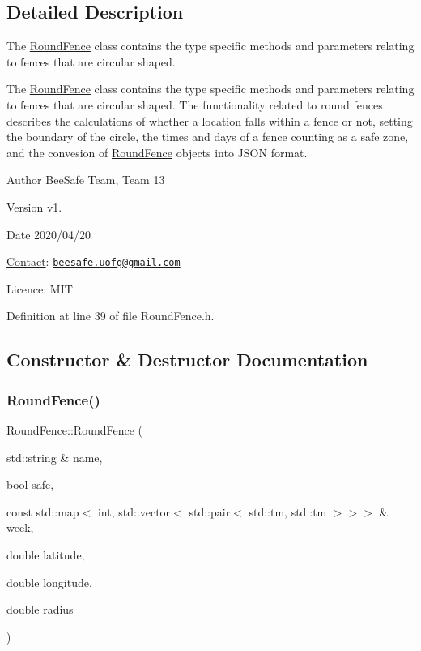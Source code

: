 \subsection{Detailed Description}
The \hyperlink{class_round_fence}{Round\+Fence} class contains the type specific methods and parameters relating to fences that are circular shaped. 

The \hyperlink{class_round_fence}{Round\+Fence} class contains the type specific methods and parameters relating to fences that are circular shaped. The functionality related to round fences describes the calculations of whether a location falls within a fence or not, setting the boundary of the circle, the times and days of a fence counting as a safe zone, and the convesion of \hyperlink{class_round_fence}{Round\+Fence} objects into J\+S\+ON format.

\begin{DoxyAuthor}{Author}
Bee\+Safe Team, Team 13
\end{DoxyAuthor}
\begin{DoxyVersion}{Version}
v1.
\end{DoxyVersion}
\begin{DoxyDate}{Date}
2020/04/20
\end{DoxyDate}
\hyperlink{class_contact}{Contact}\+: \href{mailto:beesafe.uofg@gmail.com}{\tt beesafe.\+uofg@gmail.\+com}

Licence\+: M\+IT 

Definition at line 39 of file Round\+Fence.\+h.



\subsection{Constructor \& Destructor Documentation}
\mbox{\label{class_round_fence_afd452f0c483dbe4b328fc56723ae953c}} 
\subsubsection{\texorpdfstring{Round\+Fence()}{RoundFence()}\hspace{0.1cm}{\footnotesize\ttfamily [1/3]}}
{\footnotesize\ttfamily Round\+Fence\+::\+Round\+Fence (\begin{DoxyParamCaption}\item[{std\+::string \&}]{name,  }\item[{bool}]{safe,  }\item[{const std\+::map$<$ int, std\+::vector$<$ std\+::pair$<$ std\+::tm, std\+::tm $>$$>$$>$ \&}]{week,  }\item[{double}]{latitude,  }\item[{double}]{longitude,  }\item[{double}]{radius }\end{DoxyParamCaption})}



